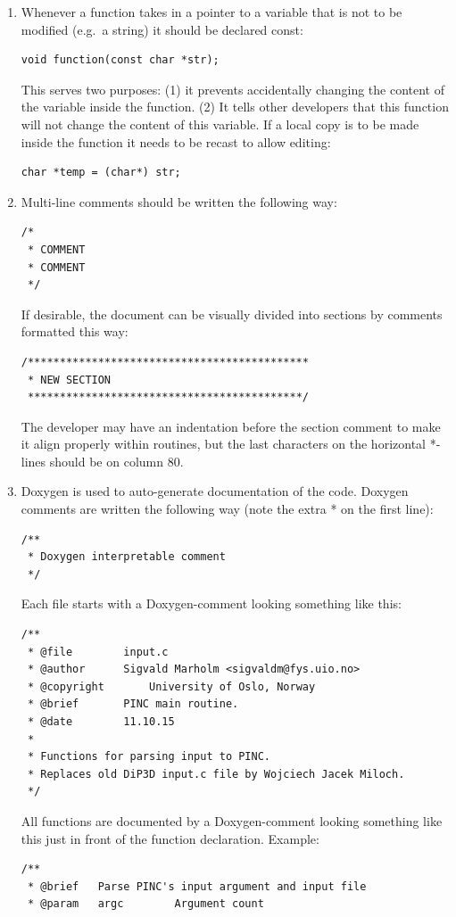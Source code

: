 \documentclass[10pt,a4paper]{article}
\begin{document}
\begin{enumerate}
	\item Whenever a function takes in a pointer to a variable that is not to be modified (e.g.\ a string) it should be declared const:
	\begin{lstlisting}
void function(const char *str);
	\end{lstlisting}
	This serves two purposes: (1) it prevents accidentally changing the content of the variable inside the function. (2) It tells other developers that this function will not change the content of this variable. If a local copy is to be made inside the function it needs to be recast to allow editing:
	\begin{lstlisting}
char *temp = (char*) str;
	\end{lstlisting}
	\item Multi-line comments should be written the following way:
	\begin{lstlisting}
/*
 * COMMENT
 * COMMENT
 */
	 \end{lstlisting}
	If desirable, the document can be visually divided into sections by comments formatted this way:
	 \begin{lstlisting}
/********************************************
 * NEW SECTION
 *******************************************/
	 \end{lstlisting}
	 The developer may have an indentation before the section comment to make it align properly within routines, but the last characters on the horizontal *-lines should be on column 80.
	 \item Doxygen is used to auto-generate documentation of the code. Doxygen comments are written the following way (note the extra * on the first line):
	 \begin{lstlisting}
/**
 * Doxygen interpretable comment
 */
	 \end{lstlisting}
	 Each file starts with a Doxygen-comment looking something like this:
	 \begin{lstlisting}
/**
 * @file		input.c
 * @author		Sigvald Marholm <sigvaldm@fys.uio.no>
 * @copyright		University of Oslo, Norway
 * @brief		PINC main routine.
 * @date		11.10.15
 *
 * Functions for parsing input to PINC.
 * Replaces old DiP3D input.c file by Wojciech Jacek Miloch.
 */	 	
	 \end{lstlisting}
	 All functions are documented by a Doxygen-comment looking something like this just in front of the function declaration. Example: 
	 \begin{lstlisting}
/**
 * @brief	Parse PINC's input argument and input file
 * @param	argc		Argument count

\end{lstlisting}
\end{enumerate}
\end{document}
